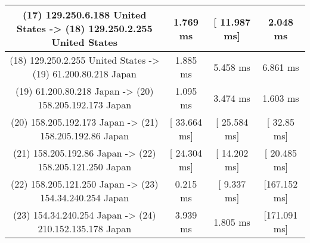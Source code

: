 \begin{table}[]
\begin{tabular}{ | c | c | c | c | }
(17) 129.250.6.188   United States   -> (18) 129.250.2.255   United States&  	     1.769 ms   &	  [ 11.987 ms]  	 &    2.048 ms    \\ \hline
(18) 129.250.2.255   United States   -> (19) 61.200.80.218   Japan        &  	     1.885 ms   &	     5.458 ms   	 &    6.861 ms    \\ \hline
(19) 61.200.80.218   Japan           -> (20) 158.205.192.173 Japan        &  	     1.095 ms   &	     3.474 ms   	 &    1.603 ms    \\ \hline
(20) 158.205.192.173 Japan           -> (21) 158.205.192.86  Japan        &  	  [ 33.664 ms]  &	  [ 25.584 ms]  	 & [  32.85 ms]   \\ \hline
(21) 158.205.192.86  Japan           -> (22) 158.205.121.250 Japan        &  	  [ 24.304 ms]  &	  [ 14.202 ms]  	 & [ 20.485 ms]   \\ \hline
(22) 158.205.121.250 Japan           -> (23) 154.34.240.254  Japan        &  	     0.215 ms   &	  [  9.337 ms]  	 & [167.152 ms]   \\ \hline
(23) 154.34.240.254  Japan           -> (24) 210.152.135.178 Japan        &  	     3.939 ms   &	     1.805 ms   	 & [171.091 ms]   \\ \hline
\end{tabular}
\end{table}
